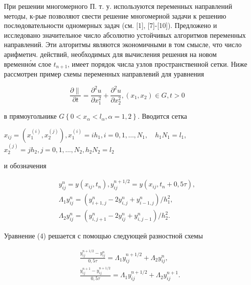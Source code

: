 \documentclass[10pt]{article}
\begin{document}
При решении многомерного П. т. у. используются переменных направлений методы, к-рые позволяют свести решение многомерной задачи к решению послөдовательности одномерных задач (см. [1], [7]-[10]). Предложено и исследовано значительное число абсолютно устойчивых алгоритмов переменных направлений. Эти алгоритмы являются экономичными в том смысле, что число арифметич. действий, необходимых для вычисления решения на новом временно́м слое $t_{n+1}$, имеет порядок числа узлов пространственной сетки. Ниже рассмотрен пример схемы переменных направлевий для уравнения



\[

\frac{\partial \|}{\partial t}=\frac{\partial^{2} u}{\partial x_{1}^{2}}+\frac{\partial^{2} u}{\partial x_{2}^{2}},\left(x_{1}, x_{2}\right) \in G, t>0

\]



в прямоугольнике $G\left\{0<x_{\alpha}<l_{\alpha}, \alpha=1,2\right\}$. Вводится сетка



$x_{i j}=\left(x_{1}^{(i)}, x_{2}^{(j)}\right), x_{1}^{(i)}=i h_{1}, i=0,1, \ldots, N_{1}, \quad h_{1} N_{1}=l_{1}$, $x_{2}^{(j)}=j h_{2}, j=0,1, \ldots, N_{2}, h_{2} N_{2}=l_{2}$



и обозначения



\[

\begin{gathered}

y_{i j}^{n}=y\left(x_{i j}, t_{n}\right), y_{i j}^{n+1 / 2}=y\left(x_{i j}, t_{n}+0,5 \tau\right), \\

\Lambda_{1} y_{i j}^{n}=\left(y_{i+1, j}^{n}-2 y_{i, j}^{n}+y_{i-1, j}^{n}\right) / h_{1}^{2}, \\

\Lambda_{2} y_{i j}^{n}=\left(y_{i, j+1}^{n}-2 y_{i j}^{n}+y_{i, j-1}^{n}\right) / h_{2}^{2} .

\end{gathered}

\]



Уравнение (4) решается с помощью следующеӥ разностной схемы



\[

\begin{aligned}

& \frac{y_{i j}^{n+1 / 2}-y_{i j}^{n}}{0,5 \tau}=\Lambda_{1} y_{i j}^{n+1 / 2}+\Lambda_{2} y_{i j}^{n}, \\

& \frac{y_{i j}^{n+1}-y_{i j}^{n+1 / 2}}{0,5 \tau}=\Lambda_{1} y_{i j}^{n+1 / 2}+\Lambda_{2} y_{i j}^{n+1} .

\end{aligned}

\]
\end{document}
